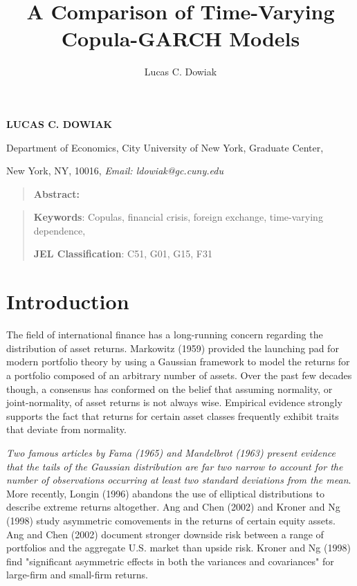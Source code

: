 \documentclass[12pt]{article}
\title{A Comparison of Time-Varying Copula-GARCH Models}
\author{Lucas C. Dowiak}
\begin{document}
 
\maketitle{}
 

\textbf{LUCAS C. DOWIAK\medskip}

Department of Economics, City University of New York\smallskip, Graduate
Center,

New York, NY, 10016, \textit{Email: ldowiak@gc.cuny.edu}

\qquad

\begin{quotation}
\textbf{Abstract:}
\end{quotation}

\vspace{1pt}

\begin{quotation}
\textbf{Keywords}: Copulas, financial crisis, foreign exchange, time-varying
dependence,

\textbf{JEL Classification}: C51, G01, G15, F31
\end{quotation}

\vspace{1pt}

\section{Introduction}

The field of international finance has a long-running concern regarding the
distribution of asset returns. Markowitz (1959) provided the launching pad
for modern portfolio theory by using a Gaussian framework to model the returns
for a portfolio composed of an arbitrary number of assets. Over the past few
decades though, a consensus has conformed on the belief that assuming
normality, or joint-normality, of asset returns is not always wise. Empirical
evidence strongly supports the fact that returns for certain asset classes
frequently exhibit traits that deviate from normality.

\emph{Two famous articles by Fama (1965) and Mandelbrot (1963) present
evidence that the tails of the Gaussian distribution are far two narrow to
account for the number of observations occurring at least two standard
deviations from the mean}. More recently, Longin (1996) abandons the use of
elliptical distributions to describe extreme returns altogether. Ang and Chen
(2002) and Kroner and Ng (1998) study asymmetric comovements in the returns of
certain equity assets. Ang and Chen (2002) document stronger downside risk
between a range of portfolios and the aggregate U.S. market than upside risk.
Kroner and Ng (1998) find "significant asymmetric effects in both the
variances and covariances" for large-firm and small-firm returns.
\end{document}

